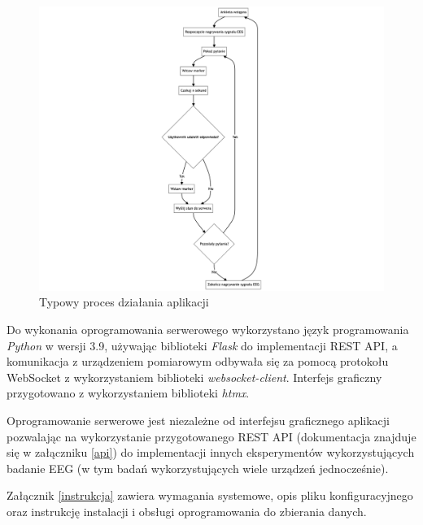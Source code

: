 \documentclass{./assets/wfis}
\begin{document}
\begin{figure}[h!]
    \centering
    \includegraphics[width=\columnwidth]{thesis/assets/app_flow.png}
    \caption{Typowy proces działania aplikacji}
    \label{fig:app-flow}
\end{figure}

Do wykonania oprogramowania serwerowego wykorzystano język programowania \textit{Python}\cite{python_developers_python_2024} w wersji 3.9, używając biblioteki \textit{Flask}\cite{flask_developers_flask_nodate} do implementacji REST API, a komunikacja z urządzeniem pomiarowym odbywała się za pomocą protokołu WebSocket z wykorzystaniem biblioteki \textit{websocket-client}\cite{liris_websocket-client_nodate}. Interfejs graficzny przygotowano z wykorzystaniem biblioteki \textit{htmx}\cite{htmx_developers_htmx_nodate}.

Oprogramowanie serwerowe jest niezależne od interfejsu graficznego aplikacji pozwalając na wykorzystanie przygotowanego REST API (dokumentacja znajduje się w załączniku \ref{api}) do implementacji innych eksperymentów wykorzystujących badanie EEG (w tym badań wykorzystujących  wiele urządzeń jednocześnie).

Załącznik \ref{instrukcja} zawiera wymagania systemowe, opis pliku konfiguracyjnego oraz instrukcję instalacji i obsługi oprogramowania do zbierania danych.
\end{document}

